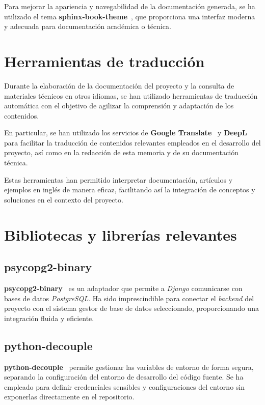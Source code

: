 Para mejorar la apariencia y navegabilidad de la documentación generada, se ha utilizado el tema 
\textbf{sphinx-book-theme}~\cite{web:sphinxbooktheme}, que proporciona una interfaz moderna y adecuada para 
documentación académica o técnica.

\section{Herramientas de traducción}

Durante la elaboración de la documentación del proyecto y la consulta de materiales técnicos en otros idiomas, 
se han utilizado herramientas de traducción automática con el objetivo de agilizar la comprensión y adaptación de los contenidos.

En particular, se han utilizado los servicios de \textbf{Google Translate}~\cite{web:googletranslator} y 
\textbf{DeepL}~\cite{web:deepl} para facilitar la traducción de contenidos relevantes empleados 
en el desarrollo del proyecto, así como en la redacción de esta memoria y de su documentación técnica.

Estas herramientas han permitido interpretar documentación, artículos y ejemplos en inglés de manera eficaz, 
facilitando así la integración de conceptos y soluciones en el contexto del proyecto.

\section{Bibliotecas y librerías relevantes}

\subsection{psycopg2-binary}

\textbf{psycopg2-binary}~\cite{web:psycopg2-binary} es un adaptador que permite a \textit{Django} comunicarse con bases de datos \textit{PostgreSQL}. 
Ha sido imprescindible para conectar el \textit{backend} del proyecto con el sistema gestor de base de datos seleccionado, 
proporcionando una integración fluida y eficiente.

\subsection{python-decouple}

\textbf{python-decouple}~\cite{web:python-decouple} permite gestionar las variables de entorno de forma segura, 
separando la configuración del entorno de desarrollo del código fuente. Se ha empleado para definir credenciales sensibles y 
configuraciones del entorno sin exponerlas directamente en el repositorio.

